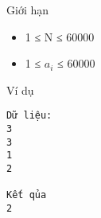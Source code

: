 Giới hạn
\begin{itemize}
	\item     1 ≤ N ≤ 60000   
	\item     1 ≤ $a_{i}$    ≤ 60000   
\end{itemize}
Ví dụ
\begin{verbatim}
Dữ liệu:
3
3
1
2

Kết qủa
2
\end{verbatim}
